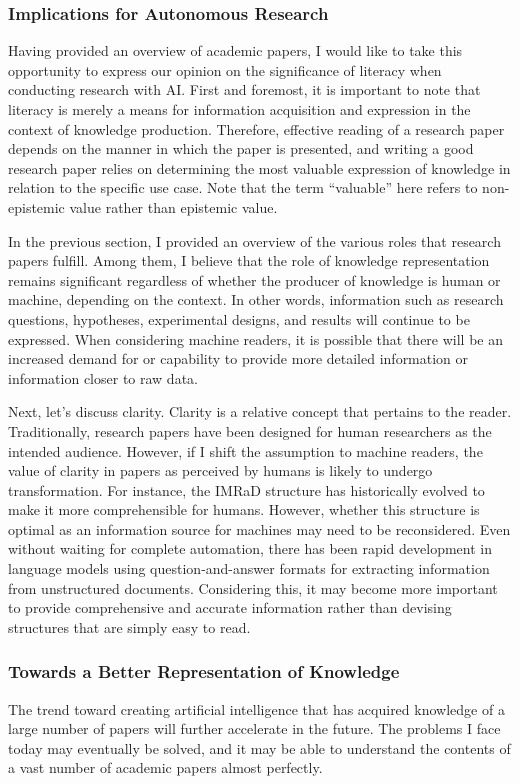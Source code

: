 \documentclass{article}
\begin{document}
\subsubsection{Implications for Autonomous Research}
Having provided an overview of academic papers, I would like to take this opportunity to express our opinion on the significance of literacy when conducting research with AI. First and foremost, it is important to note that literacy is merely a means for information acquisition and expression in the context of knowledge production. Therefore, effective reading of a research paper depends on the manner in which the paper is presented, and writing a good research paper relies on determining the most valuable expression of knowledge in relation to the specific use case. Note that the term ``valuable'' here refers to non-epistemic value rather than epistemic value.

In the previous section, I provided an overview of the various roles that research papers fulfill. Among them, I believe that the role of knowledge representation remains significant regardless of whether the producer of knowledge is human or machine, depending on the context. In other words, information such as research questions, hypotheses, experimental designs, and results will continue to be expressed. When considering machine readers, it is possible that there will be an increased demand for or capability to provide more detailed information or information closer to raw data.

Next, let's discuss clarity. Clarity is a relative concept that pertains to the reader. Traditionally, research papers have been designed for human researchers as the intended audience. However, if I shift the assumption to machine readers, the value of clarity in papers as perceived by humans is likely to undergo transformation. For instance, the IMRaD structure has historically evolved to make it more comprehensible for humans. However, whether this structure is optimal as an information source for machines may need to be reconsidered. Even without waiting for complete automation, there has been rapid development in language models using question-and-answer formats for extracting information from unstructured documents. Considering this, it may become more important to provide comprehensive and accurate information rather than devising structures that are simply easy to read.

\subsubsection{Towards a Better Representation of Knowledge}
The trend toward creating artificial intelligence that has acquired knowledge of a large number of papers will further accelerate in the future. The problems I face today may eventually be solved, and it may be able to understand the contents of a vast number of academic papers almost perfectly. 
\end{document}
